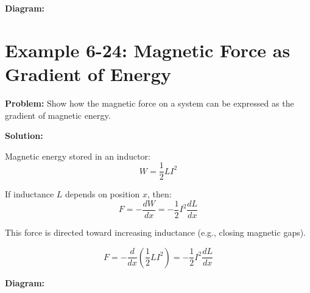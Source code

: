 \documentclass[12pt]{article}
\begin{document}
\textbf{Diagram:}
\begin{center}
\end{center}



\section*{Example 6-24: Magnetic Force as Gradient of Energy}

\textbf{Problem:}  
Show how the magnetic force on a system can be expressed as the gradient of magnetic energy.

\textbf{Solution:}

Magnetic energy stored in an inductor:
\[
W = \frac{1}{2} L I^2
\]

If inductance \( L \) depends on position \( x \), then:
\[
F = -\frac{dW}{dx} = -\frac{1}{2} I^2 \frac{dL}{dx}
\]

This force is directed toward increasing inductance (e.g., closing magnetic gaps).

\begin{tcolorbox}
\[
\boxed{F = -\frac{d}{dx} \left( \frac{1}{2} L I^2 \right) = -\frac{1}{2} I^2 \frac{dL}{dx}}
\]
\end{tcolorbox}

\textbf{Diagram:}
\begin{center}
\end{center}
\end{document}
